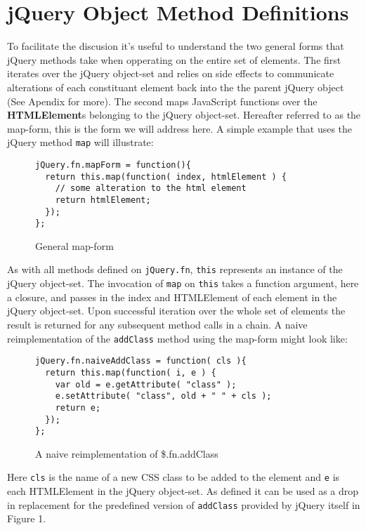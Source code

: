 \documentclass[preprint]{sigplanconf}
\begin{document}
\section{jQuery Object Method Definitions}

To facilitate the discusion it's useful to understand the two general forms that jQuery methods take when opperating on the entire set of elements. The first iterates over the jQuery object-set and relies on side effects to communicate alterations of each constituant element back into the the parent jQuery object (See Apendix for more). The second maps JavaScript functions over the \textbf{HTMLElement}s belonging to the jQuery object-set. Hereafter referred to as the map-form, this is the form we will address here. A simple example that uses the jQuery method \verb|map| will illustrate:

\begin{figure}[h!]
\begin{verbatim}
jQuery.fn.mapForm = function(){
  return this.map(function( index, htmlElement ) {
    // some alteration to the html element
    return htmlElement;
  });
};
\end{verbatim}
\nocaptionrule \caption{General map-form}
\end{figure}

As with all methods defined on \verb|jQuery.fn|, \verb|this| represents an instance of the jQuery object-set. The invocation of \verb|map| on \verb|this| takes a function argument, here a closure, and passes in the index and HTMLElement of each element in the jQuery object-set. Upon successful iteration over the whole set of elements the result is returned for any subsequent method calls in a chain. A naive reimplementation of the \verb|addClass| method using the map-form might look like:

\begin{figure}[h!]
\begin{verbatim}
jQuery.fn.naiveAddClass = function( cls ){
  return this.map(function( i, e ) {
    var old = e.getAttribute( "class" );
    e.setAttribute( "class", old + " " + cls );
    return e;
  });
};
\end{verbatim}
\nocaptionrule \caption{A naive reimplementation of \$.fn.addClass}
\end{figure}

Here \verb|cls| is the name of a new CSS class to be added to the element and \verb|e| is each HTMLElement in the jQuery object-set. As defined it can be used as a drop in replacement for the predefined version of \verb|addClass| provided by jQuery itself in Figure 1.
\end{document}
